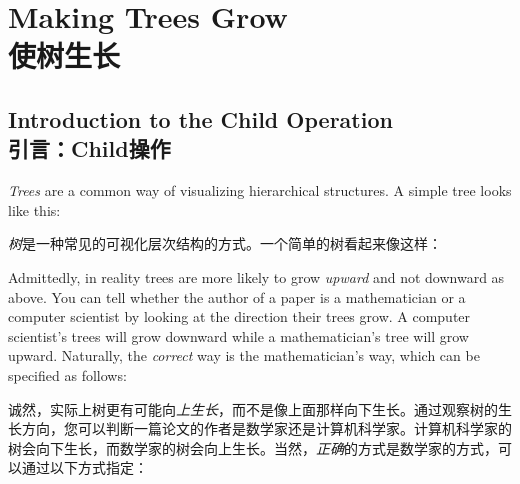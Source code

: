 \setcounter{section}{20}
\setcounter{subsection}{6}
\setcounter{subsubsection}{0}





\section{Making Trees Grow\\使树生长}
\label{section-trees}

\subsection{Introduction to the  Child Operation\\引言：Child操作}

\emph{Trees} are a common way of visualizing hierarchical structures. A simple
tree looks like this:

\emph{树}是一种常见的可视化层次结构的方式。一个简单的树看起来像这样：

\begin{codeexample}[]
\end{codeexample}

Admittedly, in reality trees are more likely to grow \emph{upward} and not
downward as above. You can tell whether the author of a paper is a
mathematician or a computer scientist by looking at the direction their trees
grow. A computer scientist's trees will grow downward while a mathematician's
tree will grow upward. Naturally, the \emph{correct} way is the mathematician's
way, which can be specified as follows:

诚然，实际上树更有可能向\emph{上生长}，而不是像上面那样向下生长。通过观察树的生长方向，您可以判断一篇论文的作者是数学家还是计算机科学家。计算机科学家的树会向下生长，而数学家的树会向上生长。当然，\emph{正确}的方式是数学家的方式，可以通过以下方式指定：

\begin{codeexample}[]
\end{codeexample}

